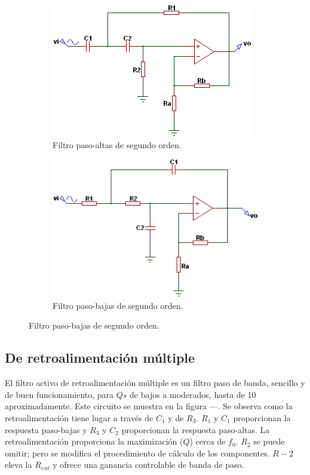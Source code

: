 \begin{figure}[H]
    \centering
    \begin{subfigure}[c]{0.45\textwidth}
        \includegraphics[width=\textwidth]{Imagenes/Filtros Sallen y Key Paso-Altas.png}
        \caption{Filtro paso-altas de segundo orden.}
    \end{subfigure}
    \begin{subfigure}[c]{0.45\textwidth}
        \includegraphics[width=\textwidth]{Imagenes/Filtros Sallen y Key Paso-Bajas.png}
        \caption{Filtro paso-bajas de segundo orden.}
    \end{subfigure}
\end{figure}

\subsection{De retroalimentación múltiple}
El filtro activo de retroalimentación múltiple es un filtro paso de banda, sencillo y de buen funcionamiento, para $Qs$ de bajos a moderados, hasta de 10 aproximadamente. Este circuito se muestra en la figura ---. Se observa como la retroalimentación tiene lugar a través de $C_1$ y de $R_3$. $R_1$ y $C_1$ proporcionan la respuesta paso-bajas y $R_3$ y $C_2$ proporcionan la respuesta paso-altas. La retroalimentación proporciona la maximización ($Q$) cerca de $f_0$. $R_2$ se puede omitir; pero se modifica el procedimiento de cálculo de los componentes. $R-2$ eleva la $R_{ent}$ y ofrece una ganancia controlable de banda de paso.


